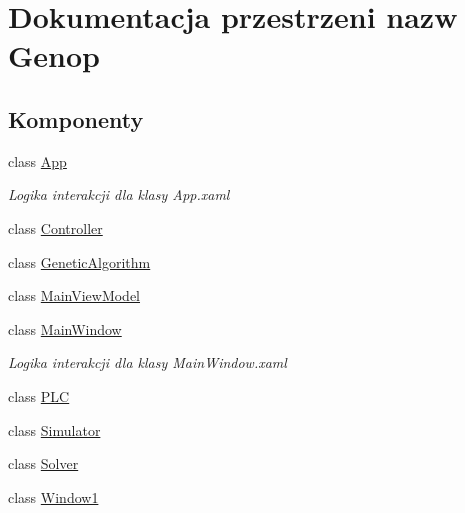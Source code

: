\hypertarget{namespaceGenop}{}\section{Dokumentacja przestrzeni nazw Genop}
\label{namespaceGenop}
\subsection*{Komponenty}
\begin{DoxyCompactItemize}
\item 
class \hyperlink{classGenop_1_1App}{App}
\begin{DoxyCompactList}\small\item\em Logika interakcji dla klasy App.\+xaml \end{DoxyCompactList}\item 
class \hyperlink{classGenop_1_1Controller}{Controller}
\item 
class \hyperlink{classGenop_1_1GeneticAlgorithm}{Genetic\+Algorithm}
\item 
class \hyperlink{classGenop_1_1MainViewModel}{Main\+View\+Model}
\item 
class \hyperlink{classGenop_1_1MainWindow}{Main\+Window}
\begin{DoxyCompactList}\small\item\em Logika interakcji dla klasy Main\+Window.\+xaml \end{DoxyCompactList}\item 
class \hyperlink{classGenop_1_1PLC}{P\+LC}
\item 
class \hyperlink{classGenop_1_1Simulator}{Simulator}
\item 
class \hyperlink{classGenop_1_1Solver}{Solver}
\item 
class \hyperlink{classGenop_1_1Window1}{Window1}
\end{DoxyCompactItemize}
